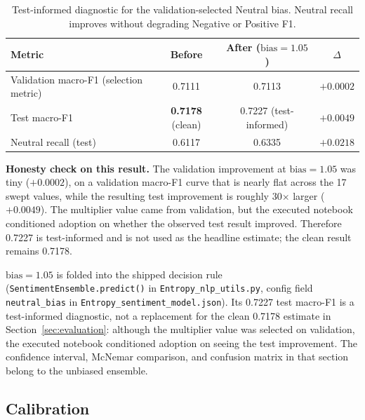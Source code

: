 \documentclass[11pt,a4paper]{article}
\begin{document}
\begin{table}[H]
\centering
\small
\begin{tabular}{@{}lccc@{}}
\toprule
\textbf{Metric} & \textbf{Before} & \textbf{After ($\text{bias}=1.05$)} & \textbf{$\Delta$} \\
\midrule
Validation macro-F1 (selection metric) & 0.7111 & 0.7113 & $+0.0002$ \\
Test macro-F1 & \textbf{0.7178} (clean) & 0.7227 (test-informed) & $+0.0049$ \\
Neutral recall (test) & 0.6117 & 0.6335 & $+0.0218$ \\
\bottomrule
\end{tabular}
\caption{Test-informed diagnostic for the validation-selected Neutral bias. Neutral recall improves without degrading Negative or Positive F1.}
\end{table}

\begin{insightbox}
\textbf{Honesty check on this result.} The validation improvement at $\text{bias}=1.05$ was tiny ($+0.0002$), on a validation macro-F1 curve that is nearly flat across the 17 swept values, while the resulting test improvement is roughly 30$\times$ larger ($+0.0049$). The multiplier value came from validation, but the executed notebook conditioned adoption on whether the observed test result improved. Therefore 0.7227 is test-informed and is not used as the headline estimate; the clean result remains 0.7178.
\end{insightbox}

$\text{bias}=1.05$ is folded into the shipped decision rule (\texttt{SentimentEnsemble.predict()} in \texttt{Entropy\_nlp\_utils.py}, config field \texttt{neutral\_bias} in \texttt{Entropy\_sentiment\_model.json}). Its 0.7227 test macro-F1 is a test-informed diagnostic, not a replacement for the clean 0.7178 estimate in Section~\ref{sec:evaluation}: although the multiplier value was selected on validation, the executed notebook conditioned adoption on seeing the test improvement. The confidence interval, McNemar comparison, and confusion matrix in that section belong to the unbiased ensemble.

\subsection{Calibration}
\end{document}
